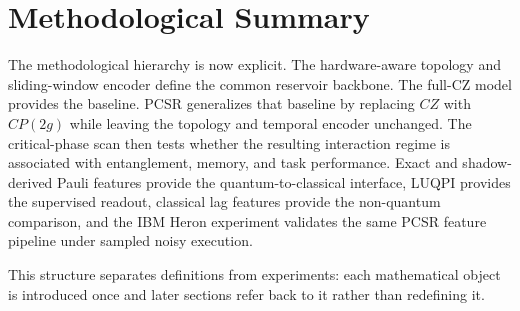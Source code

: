 \documentclass[final,1p,times]{elsarticle}
\begin{document}
\section{Methodological Summary}
\label{sec:method_summary}

The methodological hierarchy is now explicit. The hardware-aware
topology and sliding-window encoder define the common reservoir
backbone. The full-CZ model provides the baseline. PCSR generalizes
that baseline by replacing $CZ$ with $CP(2g)$ while leaving the
topology and temporal encoder unchanged. The critical-phase scan then
tests whether the resulting interaction regime is associated with
entanglement, memory, and task performance. Exact and shadow-derived
Pauli features provide the quantum-to-classical interface, LUQPI
provides the supervised readout, classical lag features provide the
non-quantum comparison, and the IBM Heron experiment validates the
same PCSR feature pipeline under sampled noisy execution.

This structure separates definitions from experiments: each mathematical
object is introduced once and later sections refer back to it rather
than redefining it.


% 
\end{document}
